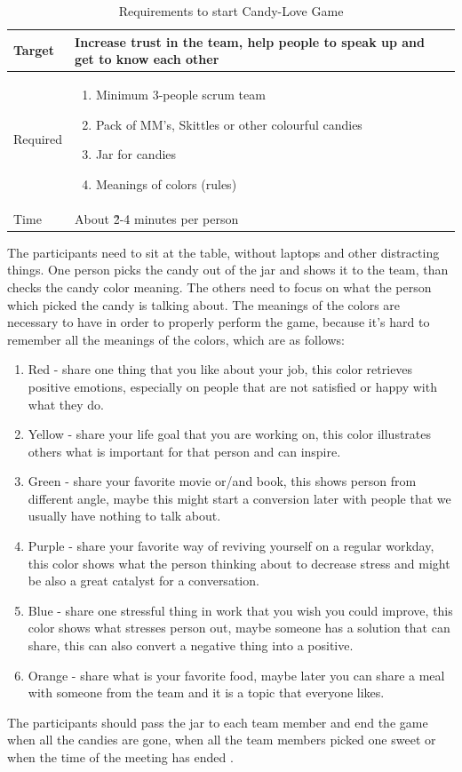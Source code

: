 \begin{table}[h]
	\caption{Requirements to start Candy-Love Game}
	\label{tab:candylove-req}
	\begin{tabularx}{\textwidth}{|X|X|}
	\hline
		Target & Increase trust in the team, help people to speak up and get to know each other \\ \hline
		Required			& \begin{enumerate}
		    \item Minimum 3-people scrum team
		    \item Pack of MM's, Skittles or other colourful candies
		    \item Jar for candies
		    \item Meanings of colors (rules)
		\end{enumerate}	 \\ \hline
		Time			& About \~2-4 minutes per person	 \\ \hline
	\end{tabularx}
\end{table}
The participants need to sit at the table, without laptops and other distracting things. One person picks the candy out of the jar and shows it to the team, than checks the candy color meaning. The others need to focus on what the person which picked the candy is talking about. The meanings of the colors are necessary to have in order to properly perform the game, because it's hard to remember all the meanings of the colors, which are as follows: 
\begin{enumerate}
    \item Red - share one thing that you like about your job, this color retrieves positive emotions, especially on people that are not satisfied or happy with what they do.
    \item Yellow - share your life goal that you are working on, this color illustrates others what is important for that person and can inspire.
    \item Green - share your favorite movie or/and book, this shows person from different angle, maybe this might start a conversion later with people that we usually have nothing to talk about.
    \item Purple - share your favorite way of reviving yourself on a regular workday, this color shows what the person thinking about to decrease stress and might be also a great catalyst for a conversation.
    \item Blue - share one stressful thing in work that you wish you could improve, this color shows what stresses person out, maybe someone has a solution that can share, this can also convert a negative thing into a positive.
    \item Orange - share what is your favorite food, maybe later you can share a meal with someone from the team and it is a topic that everyone likes.
\end{enumerate}
The participants should pass the jar to each team member and end the game when all the candies are gone, when all the team members picked one sweet or when the time of the meeting has ended \cite{CandyLoveBibliography}.

